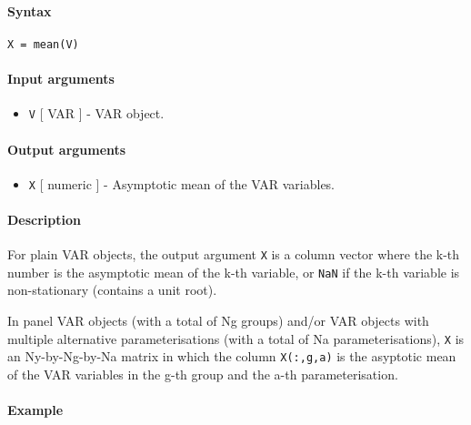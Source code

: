 


	\paragraph{Syntax}

\begin{verbatim}
X = mean(V)
\end{verbatim}

\paragraph{Input arguments}

\begin{itemize}
\itemsep1pt\parskip0pt
\item
  \texttt{V} {[} VAR {]} - VAR object.
\end{itemize}

\paragraph{Output arguments}

\begin{itemize}
\itemsep1pt\parskip0pt
\item
  \texttt{X} {[} numeric {]} - Asymptotic mean of the VAR variables.
\end{itemize}

\paragraph{Description}

For plain VAR objects, the output argument \texttt{X} is a column vector
where the k-th number is the asymptotic mean of the k-th variable, or
\texttt{NaN} if the k-th variable is non-stationary (contains a unit
root).

In panel VAR objects (with a total of Ng groups) and/or VAR objects with
multiple alternative parameterisations (with a total of Na
parameterisations), \texttt{X} is an Ny-by-Ng-by-Na matrix in which the
column \texttt{X(:,g,a)} is the asyptotic mean of the VAR variables in
the g-th group and the a-th parameterisation.

\paragraph{Example}


